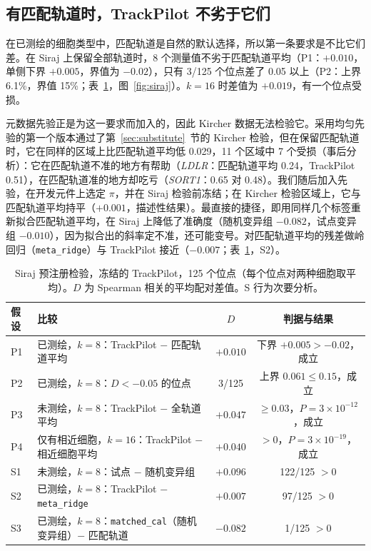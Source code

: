 \documentclass[webpdf,contemporary,large]{oup-authoring-template}
\newcommand{\tp}{TrackPilot}
\begin{document}
\subsection{有匹配轨道时，\tp{} 不劣于它们}

在已测绘的细胞类型中，匹配轨道是自然的默认选择，所以第一条要求是不比它们差。在 Siraj 上保留全部轨道时，8 个测量值不劣于匹配轨道平均（P1：$+0.010$，单侧下界 $+0.005$，界值为 $-0.02$），只有 3/125 个位点差了 0.05 以上（P2：上界 6.1\%，界值 15\%；表~\ref{tab:siraj}，图~\ref{fig:siraj}）。$k=16$ 时差值为 $+0.019$，有一个位点受损。

元数据先验正是为这一要求而加入的，因此 Kircher 数据无法检验它。采用均匀先验的第一个版本通过了第~\ref{sec:substitute}~节的 Kircher 检验，但在保留匹配轨道时，它在同样的区域上比匹配轨道平均低 0.029，11 个区域中 7 个受损（事后分析）：它在匹配轨道不准的地方有帮助（\textit{LDLR}：匹配轨道平均 0.24，\tp{} 0.51），在匹配轨道准的地方却吃亏（\textit{SORT1}：0.65 对 0.48）。我们随后加入先验，在开发元件上选定 $\pi$，并在 Siraj 检验前冻结；在 Kircher 检验区域上，它与匹配轨道平均持平（$+0.001$，描述性结果）。最直接的捷径，即用同样几个标签重新拟合匹配轨道平均，在 Siraj 上降低了准确度（随机变异组 $-0.082$，试点变异组 $-0.010$），因为拟合出的斜率定不准，还可能变号。对匹配轨道平均的残差做岭回归（\texttt{meta\_ridge}）与 \tp{} 接近（$-0.007$；表~\ref{tab:siraj}，S2）。

\begin{table}[t]
\centering
\caption{Siraj 预注册检验，冻结的 \tp{}，125 个位点（每个位点对两种细胞取平均）。$D$ 为 Spearman 相关的平均配对差值。S 行为次要分析。}
\label{tab:siraj}
\begin{tabular}{llcc}
\toprule
假设 & 比较 & $D$ & 判据与结果 \\
\midrule
P1 & 已测绘，$k=8$：\tp{} $-$ 匹配轨道平均 & $+0.010$ & 下界 $+0.005 > -0.02$，成立 \\
P2 & 已测绘，$k=8$：$D<-0.05$ 的位点 & 3/125 & 上界 $0.061 \le 0.15$，成立 \\
P3 & 未测绘，$k=8$：\tp{} $-$ 全轨道平均 & $+0.047$ & $\ge 0.03$，$P=3\!\times\!10^{-12}$，成立 \\
P4 & 仅有相近细胞，$k=16$：\tp{} $-$ 相近细胞平均 & $+0.040$ & $>0$，$P=3\!\times\!10^{-19}$，成立 \\
\midrule
S1 & 未测绘，$k=8$：试点 $-$ 随机变异组 & $+0.096$ & 122/125 $>0$ \\
S2 & 已测绘，$k=8$：\tp{} $-$ \texttt{meta\_ridge} & $+0.007$ & 97/125 $>0$ \\
S3 & 已测绘，$k=8$：\texttt{matched\_cal}（随机变异组）$-$ 匹配轨道 & $-0.082$ & 1/125 $>0$ \\
\bottomrule
\end{tabular}
\end{table}
\end{document}
